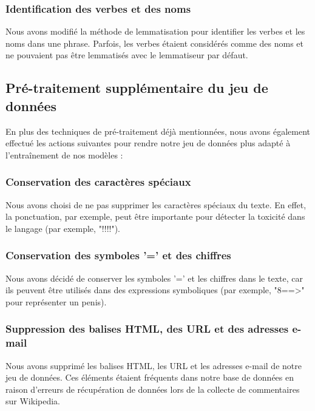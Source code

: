 \subsubsection*{Identification des verbes et des noms}

Nous avons modifié la méthode de lemmatisation pour identifier les verbes et les noms dans une phrase. Parfois, les verbes étaient considérés comme des noms et ne pouvaient pas être lemmatisés avec le lemmatiseur par défaut.

\subsection{Pré-traitement supplémentaire du jeu de données}

En plus des techniques de pré-traitement déjà mentionnées, nous avons également effectué les actions suivantes pour rendre notre jeu de données plus adapté à l'entraînement de nos modèles :

\subsubsection*{Conservation des caractères spéciaux}

Nous avons choisi de ne pas supprimer les caractères spéciaux du texte. En effet, la ponctuation, par exemple, peut être importante pour détecter la toxicité dans le langage (par exemple, "!!!!").

\subsubsection*{Conservation des symboles '=' et des chiffres}

Nous avons décidé de conserver les symboles '=' et les chiffres dans le texte, car ils peuvent être utilisés dans des expressions symboliques (par exemple, "8==>" pour représenter un penis).

\subsubsection*{Suppression des balises HTML, des URL et des adresses e-mail}

Nous avons supprimé les balises HTML, les URL et les adresses e-mail de notre jeu de données. Ces éléments étaient fréquents dans notre base de données en raison d'erreurs de récupération de données lors de la collecte de commentaires sur Wikipedia.


